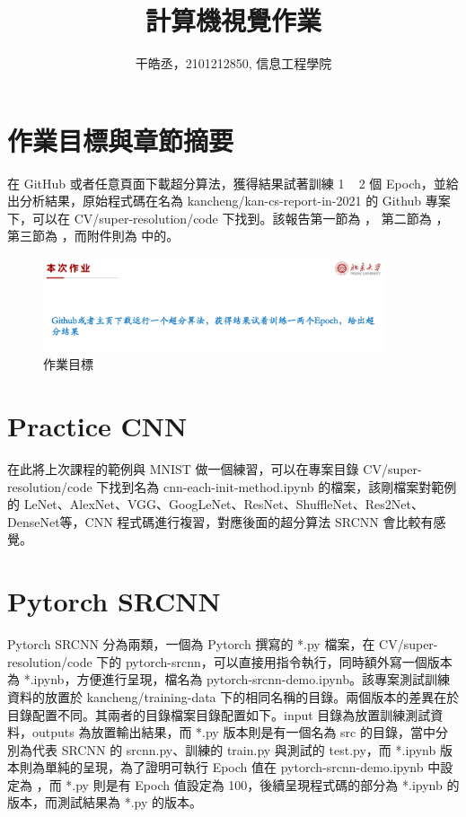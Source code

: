 \documentclass[11pt,UTF8]{ctexart}
\title{計算機視覺作業}
\author{干皓丞，2101212850, 信息工程學院}
\begin{document}
\maketitle


\section{作業目標與章節摘要}

在 GitHub 或者任意頁面下載超分算法，獲得結果試著訓練 1 ~ 2 個 Epoch，並給出分析結果，原始程式碼在名為 kancheng/kan-cs-report-in-2021 的 Github 專案下，可以在 CV/super-resolution/code 下找到。該報告第一節為  ， 第二節為 ，第三節為 ，而附件則為  中的。

\begin{figure}[H]
\centering 
\includegraphics[width=0.9\textwidth]{t1.png} 
\caption{作業目標}
\label{Test}
\end{figure}

\section{Practice CNN}

在此將上次課程的範例與 MNIST 做一個練習，可以在專案目錄 CV/super-resolution/code 下找到名為 cnn-each-init-method.ipynb 的檔案，該剛檔案對範例的 LeNet、AlexNet、VGG、GoogLeNet、ResNet、ShuffleNet、Res2Net、DenseNet等，CNN 程式碼進行複習，對應後面的超分算法 SRCNN 會比較有感覺。

\section{Pytorch SRCNN}

Pytorch SRCNN 分為兩類，一個為 Pytorch 撰寫的 *.py 檔案，在 CV/super-resolution/code 下的 pytorch-srcnn，可以直接用指令執行，同時額外寫一個版本為 *.ipynb，方便進行呈現，檔名為  pytorch-srcnn-demo.ipynb。該專案測試訓練資料的放置於 kancheng/training-data 下的相同名稱的目錄。兩個版本的差異在於目錄配置不同。其兩者的目錄檔案目錄配置如下。input 目錄為放置訓練測試資料，outputs 為放置輸出結果，而 *.py 版本則是有一個名為 src 的目錄，當中分別為代表 SRCNN 的 srcnn.py、訓練的 train.py 與測試的 test.py，而 *.ipynb 版本則為單純的呈現，為了證明可執行 Epoch 值在 pytorch-srcnn-demo.ipynb 中設定為 ，而 *.py 則是有 Epoch 值設定為 100，後續呈現程式碼的部分為 *.ipynb 的版本，而測試結果為 *.py 的版本。
\end{document}
